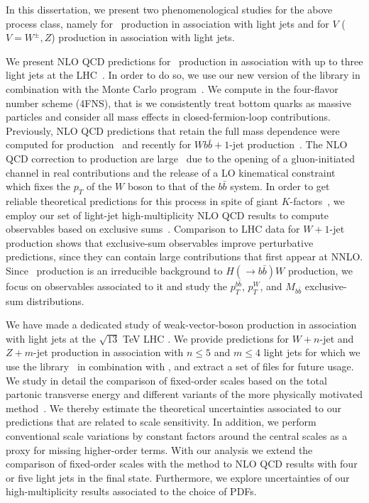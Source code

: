 In this dissertation, we present two phenomenological studies for the
above process class, namely for \Wbb~production in
association with light jets and for $V$ ($V=W^\pm,Z$)
production in association with light jets.


We present NLO QCD predictions for \Wbb~production in association with up to
three light jets at the LHC~\cite{wbbpaper}. In order to do so, we use our new version of
the \BlackHat{} library in combination with the \SHERPA{} Monte Carlo
program~\cite{Sherpa}. We compute in the four-flavor number scheme (4FNS), that is we consistently treat bottom quarks as massive particles and consider all mass effects in closed-fermion-loop contributions. Previously, NLO QCD predictions that
retain the
full mass dependence were computed for \Wbb{}
production~\mbox{\cite{FebresCordero:2006sj,Cordero:2009kv}} and
recently for $Wb\bar{b}+1$-jet production~\cite{Luisoni:2015mpa}. The NLO QCD correction to \Wbb{} production are
large~\cite{Ellis:1998fv,FebresCordero:2006sj,Cordero:2009kv} due to
the opening of a gluon-initiated channel in real contributions and the release of a LO
kinematical constraint which fixes the $p_T$ of the $W$ boson to that of the
$b\bar b$ system. In order to get reliable theoretical predictions for this process in
spite of giant $K$-factors~\cite{Rubin:2010xp}, we employ our set of
light-jet high-multiplicity NLO QCD results to compute observables
based on exclusive sums~\cite{ESums}. Comparison to LHC
data for $W+1$-jet
production \cite{Aad:2014qxa,ATLAS:ratio2017} shows that exclusive-sum
observables improve perturbative predictions, since they can contain
large contributions that first appear at NNLO. Since \Wbb~production is an
irreducible background to $H(\rightarrow b{\bar b})W$
production, we focus on observables associated to it and study the $p_T^{b\bar b}$, $p_T^W$, and
$M_{b\bar b}$ exclusive-sum distributions.



We have made a dedicated study of weak-vector-boson production in
association with light jets at the $\sqrt{13}$ TeV LHC \cite{Anger:2017nkq}. We provide predictions for $W+n$-jet and $Z+m$-jet production in
association with $n\leq 5$ and \mbox{$m\leq 4$} light jets for which
we use the \BlackHat{} library~\cite{BlackHatI}
in combination with \SHERPA{} \cite{Sherpa}, and extract a set of
\ntuple{} files \cite{BH:Ntuples} for future usage. We study in detail the comparison of fixed-order scales based on the total partonic transverse energy and
different variants of the more physically motivated \MINLO{} method~\cite{MINLO}. We thereby estimate
the theoretical uncertainties associated
to our predictions that are related to scale sensitivity. In addition,
we perform conventional scale variations by constant factors around the central
scales as a proxy for missing higher-order terms. With our
analysis we extend the comparison of fixed-order scales with the
\MINLO{} method to NLO QCD results with four or five light jets in the final
state. Furthermore, we explore uncertainties of our high-multiplicity
results associated to the choice of PDFs.


